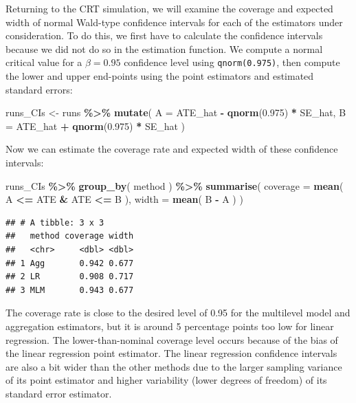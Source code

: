 \documentclass[
]{book}
\newenvironment{Shaded}{\begin{snugshade}}{\end{snugshade}}
\newcommand{\AttributeTok}[1]{\textcolor[rgb]{0.13,0.29,0.53}{#1}}
\newcommand{\FloatTok}[1]{\textcolor[rgb]{0.00,0.00,0.81}{#1}}
\newcommand{\FunctionTok}[1]{\textcolor[rgb]{0.13,0.29,0.53}{\textbf{#1}}}
\newcommand{\NormalTok}[1]{#1}
\newcommand{\OtherTok}[1]{\textcolor[rgb]{0.56,0.35,0.01}{#1}}
\newcommand{\SpecialCharTok}[1]{\textcolor[rgb]{0.81,0.36,0.00}{\textbf{#1}}}
\begin{document}
Returning to the CRT simulation, we will examine the coverage and expected width of normal Wald-type confidence intervals for each of the estimators under consideration.
To do this, we first have to calculate the confidence intervals because we did not do so in the estimation function.
We compute a normal critical value for a \(\beta = 0.95\) confidence level using \texttt{qnorm(0.975)}, then compute the lower and upper end-points using the point estimators and estimated standard errors:

\begin{Shaded}
\begin{Highlighting}[]
\NormalTok{runs\_CIs }\OtherTok{\textless{}{-}} 
\NormalTok{  runs }\SpecialCharTok{\%\textgreater{}\%} 
  \FunctionTok{mutate}\NormalTok{( }
    \AttributeTok{A =}\NormalTok{ ATE\_hat }\SpecialCharTok{{-}} \FunctionTok{qnorm}\NormalTok{(}\FloatTok{0.975}\NormalTok{) }\SpecialCharTok{*}\NormalTok{ SE\_hat,}
    \AttributeTok{B =}\NormalTok{ ATE\_hat }\SpecialCharTok{+} \FunctionTok{qnorm}\NormalTok{(}\FloatTok{0.975}\NormalTok{) }\SpecialCharTok{*}\NormalTok{ SE\_hat}
\NormalTok{  )}
\end{Highlighting}
\end{Shaded}

Now we can estimate the coverage rate and expected width of these confidence intervals:

\begin{Shaded}
\begin{Highlighting}[]
\NormalTok{runs\_CIs }\SpecialCharTok{\%\textgreater{}\%}
  \FunctionTok{group\_by}\NormalTok{( method ) }\SpecialCharTok{\%\textgreater{}\%}
  \FunctionTok{summarise}\NormalTok{( }
    \AttributeTok{coverage =} \FunctionTok{mean}\NormalTok{( A }\SpecialCharTok{\textless{}=}\NormalTok{ ATE }\SpecialCharTok{\&}\NormalTok{ ATE }\SpecialCharTok{\textless{}=}\NormalTok{ B ),}
    \AttributeTok{width =} \FunctionTok{mean}\NormalTok{( B }\SpecialCharTok{{-}}\NormalTok{ A )}
\NormalTok{  )}
\end{Highlighting}
\end{Shaded}

\begin{verbatim}
## # A tibble: 3 x 3
##   method coverage width
##   <chr>     <dbl> <dbl>
## 1 Agg       0.942 0.677
## 2 LR        0.908 0.717
## 3 MLM       0.943 0.677
\end{verbatim}

The coverage rate is close to the desired level of 0.95 for the multilevel model and aggregation estimators, but it is around 5 percentage points too low for linear regression.
The lower-than-nominal coverage level occurs because of the bias of the linear regression point estimator.
The linear regression confidence intervals are also a bit wider than the other methods due to the larger sampling variance of its point estimator and higher variability (lower degrees of freedom) of its standard error estimator.
\end{document}
